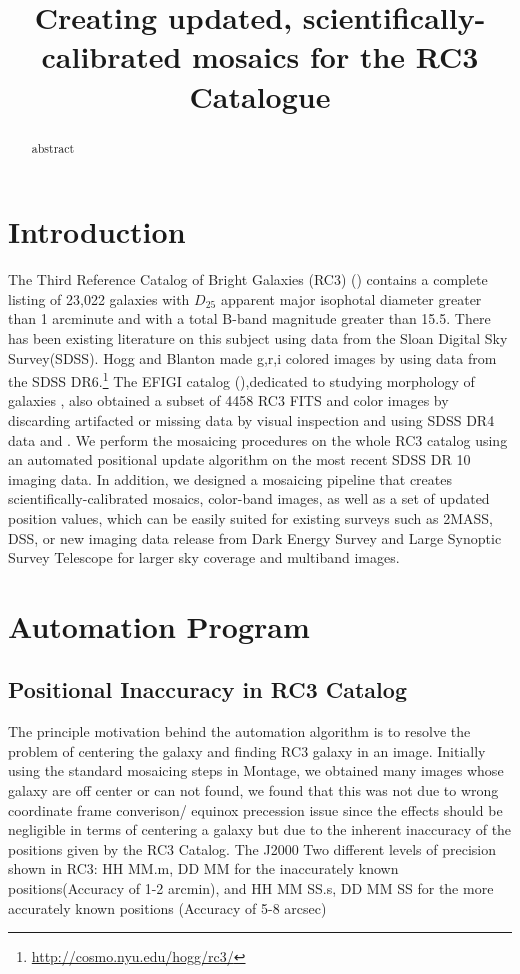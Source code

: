 \documentclass[5p]{elsarticle}
\begin{document}
\title{Creating updated, scientifically-calibrated mosaics for the RC3 Catalogue}
\maketitle
\begin{abstract}
abstract
\end{abstract}


\section{Introduction}
The Third Reference Catalog of Bright Galaxies (RC3) (\citet{rc3}) contains a  complete listing of 23,022 galaxies with $D_25$ apparent major isophotal diameter  greater than 1 arcminute and with a total B-band magnitude greater than 15.5. There has been existing literature on this subject using data from the Sloan Digital Sky Survey(SDSS). Hogg and Blanton made g,r,i colored images by using data from the SDSS DR6.\footnote{\url{http://cosmo.nyu.edu/hogg/rc3/}} The EFIGI catalog (\citet{efigi}),dedicated to studying morphology of galaxies , also  obtained a subset of 4458 RC3 FITS and color images by discarding artifacted or missing data by visual inspection and using SDSS DR4 data and . We perform the mosaicing procedures on the whole RC3 catalog using  an automated positional update algorithm  on the most recent SDSS DR 10 imaging data. In addition, we designed a mosaicing pipeline that creates scientifically-calibrated mosaics, color-band images, as well as a set of updated position values, which can be easily suited for  existing surveys such as 2MASS, DSS, or  new imaging data release from  Dark Energy Survey and Large Synoptic Survey Telescope for larger sky coverage and multiband images.
\section{Automation Program}

	\subsection{Positional Inaccuracy in RC3 Catalog}
	The principle motivation behind the automation algorithm is to resolve the problem of centering the galaxy and finding RC3 galaxy in an image. Initially using the standard mosaicing steps in Montage, we obtained many images whose galaxy are off center or can not found, we found that this was not due to wrong coordinate frame converison/ equinox precession issue since the effects should be negligible in terms of centering a galaxy but due to the inherent inaccuracy of the positions given by the RC3 Catalog. The J2000  
        Two different levels of precision shown in RC3:  HH MM.m, DD MM for  
the inaccurately known positions(Accuracy of 1-2 arcmin), and HH MM SS.s, DD MM SS for 
the more  
accurately known positions (Accuracy of 5-8 arcsec) 
\end{document}
